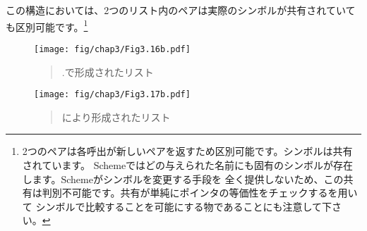 \noindent
この構造においては、2つのリスト内のペアは実際のシンボルが共有されていても区別可能です。\footnote{
2つのペアは各呼出が新しいペアを返すため区別可能です。シンボルは共有されています。
Schemeではどの与えられた名前にも固有のシンボルが存在します。Schemeがシンボルを変更する手段を
全く提供しないため、この共有は判別不可能です。共有が単純にポインタの等価性をチェックするを用いて
シンボルで比較することを可能にする物であることにも注意して下さい。}

\begin{figure}[tb]
\label{Figure 3.16}
\centering
\begin{comment}
\heading{Figure 3.16:} The list \code{z1} formed by \code{(cons x x)}.

\begin{example}
      +---+---+
z1 -->| * | * |
      +-|-+-|-+
        V   V
      +---+---+     +---+---+
 x -->| * | *-+---->| * | / |
      +-|-+---+     +-|-+---+
        V             V
      +---+         +---+
      | a |         | b |
      +---+         +---+
\end{example}
\end{comment}
\texttt{[image: fig/chap3/Fig3.16b.pdf]}
\begin{quote}
 .で形成されたリスト
\end{quote}
\end{figure}

\begin{figure}[tb]
\label{Figure 3.17}
\centering
\begin{comment}
\begin{quote}
\heading{Figure 3.17:} The list \code{z2} formed by \code{(cons (list 'a 'b) (list 'a 'b))}.

\begin{example}
      +---+---+     +---+---+     +---+---+
z2 -->| * | *-+---->| * | *-+---->| * | / |
      +-|-+---+     +-|-+---+     +-|-+---+
        |             V             V
        |           +---+         +---+
        |           | a |         | b |
        |           +---+         +---+
        |             ^             ^
        |             |             |
        |           +-|-+---+     +-|-+---+
        +---------->| * | *-+---->| * | / |
                    +---+---+     +---+---+
\end{example}
\end{quote}
\end{comment}
\texttt{[image: fig/chap3/Fig3.17b.pdf]}
\begin{quote}
 により形成されたリスト
\end{quote}
\end{figure}

